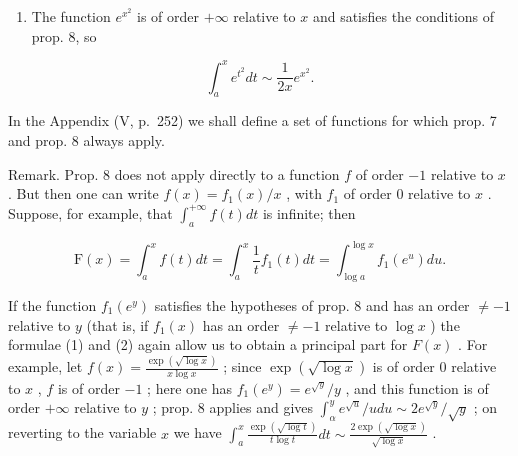 \begin{enumerate}
\def\labelenumi{\arabic{enumi})}
\setcounter{enumi}{1}
\tightlist
\item
  The function \(e^{x^2}\) is of order \(+\infty\) relative to \(x\) and satisfies the conditions of prop. 8, so
\end{enumerate}

\[
\int_ {a} ^ {x} e ^ {t ^ {2}} d t \sim \frac {1}{2 x} e ^ {x ^ {2}}.
\]

In the Appendix (V, p.~252) we shall define a set of functions for which prop. 7 and prop. 8 always apply.

Remark. Prop. 8 does not apply directly to a function \(f\) of order \(-1\) relative to \(x\) . But then one can write \(f(x) = f_1(x) / x\) , with \(f_1\) of order 0 relative to \(x\) . Suppose, for example, that \(\int_{a}^{+\infty} f(t) dt\) is infinite; then

\[
\mathrm{F} (x) = \int_ {a} ^ {x} f (t) d t = \int_ {a} ^ {x} \frac {1}{t} f _ {1} (t) d t = \int_ {\log a} ^ {\log x} f _ {1} \left(e ^ {u}\right) d u.
\]

If the function \(f_{1}(e^{y})\) satisfies the hypotheses of prop. 8 and has an order \(\neq -1\) relative to \(y\) (that is, if \(f_{1}(x)\) has an order \(\neq -1\) relative to \(\log x\) ) the formulae (1) and (2) again allow us to obtain a principal part for \(F(x)\) . For example, let \(f(x) = \frac{\exp(\sqrt{\log x})}{x\log x}\) ; since \(\exp(\sqrt{\log x})\) is of order 0 relative to \(x\) , \(f\) is of order \(-1\) ; here one has \(f_{1}(e^{y}) = e^{\sqrt{y}} / y\) , and this function is of order \(+\infty\) relative to \(y\) ; prop. 8 applies and gives \(\int_{\alpha}^{y} e^{\sqrt{u}} / u du \sim 2e^{\sqrt{y}} / \sqrt{y}\) ; on reverting to the variable \(x\) we have \(\int_{a}^{x} \frac{\exp(\sqrt{\log t})}{t\log t} dt \sim \frac{2\exp(\sqrt{\log x})}{\sqrt{\log x}}\) .

